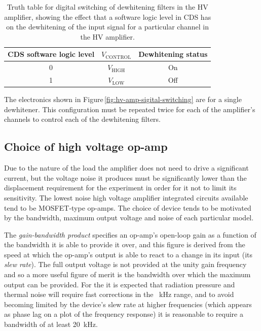 \begin{table}
  \centering
  {\renewcommand{\arraystretch}{1.2} %
    \begin{tabular}{c|c|c}
      \textbf{\gls{CDS} software logic level} & \textbf{$V_{\text{CONTROL}}$} & \textbf{Dewhitening status} \\
      \hline
      0 & $V_{\text{HIGH}}$ & On \\
      1 & $V_{\text{LOW}}$ & Off
    \end{tabular}
  }
  \caption[Truth table for digital switching of dewhitening filters in the high voltage amplifier]{\label{tab:digital-dewhitening-truth-table}Truth table for digital switching of dewhitening filters in the \gls{HV} amplifier, showing the effect that a software logic level in \gls{CDS} has on the dewhitening of the input signal for a particular channel in the \gls{HV} amplifier.}
\end{table}

The electronics shown in Figure\,\ref{fig:hv-amp-sigital-switching} are for a single dewhitener. This configuration must be repeated twice for each of the amplifier's channels to control each of the dewhitening filters.

\subsection{Choice of high voltage op-amp}
Due to the nature of the load the amplifier does not need to drive a significant current, but the voltage noise it produces must be significantly lower than the displacement requirement for the experiment in order for it not to limit its sensitivity. The lowest noise high voltage amplifier integrated circuits available tend to be \gls{MOSFET}-type op-amps. The choice of device tends to be motivated by the bandwidth, maximum output voltage and noise of each particular model.

The \emph{gain-bandwidth product} specifies an op-amp's open-loop gain as a function of the bandwidth it is able to provide it over, and this figure is derived from the speed at which the op-amp's output is able to react to a change in its input (its \emph{slew rate}). The full output voltage is not provided at the unity gain frequency and so a more useful figure of merit is the bandwidth over which the maximum output can be provided. For the \SSMEXPT{} it is expected that radiation pressure and thermal noise will require fast corrections in the \SI{}{\kilo\hertz} range, and to avoid becoming limited by the device's slew rate at higher frequencies (which appears as phase lag on a plot of the frequency response) it is reasonable to require a bandwidth of at least \SI{20}{\kilo\hertz}.

